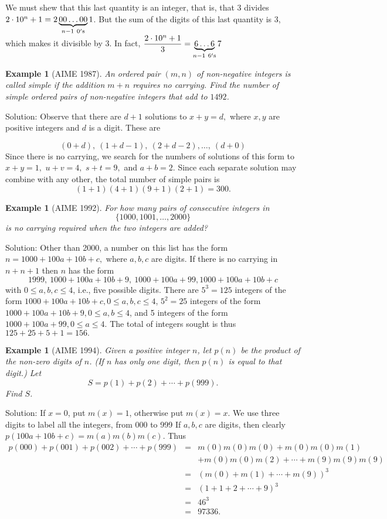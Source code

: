 \documentclass[11pt, openany]{book}
\theoremstyle{change} \theoremheaderfont{\blue\sffamily\bfseries}
\newtheorem{exa}[thm]{Example}
\theoremstyle{nonumberplain} \theoremheaderfont{\sffamily\bfseries}
\newcommand{\dis}{\displaystyle}
\newcommand{\í}{\'{\i}}
\begin{document}
We must shew that this last quantity is an integer, that is, that
3 divides $2\cdot 10^n + 1 = 2\underbrace{00\ldots 00}_{n - 1 \
0{\rm 's}}1$. But the sum of the digits of this last quantity is
3, which makes it divisible by 3. In fact, $\dis{\frac{2\cdot 10^n
+ 1}{3} = \underbrace{6\ldots 6}_{n - 1 \ 6{\rm 's}}7}$
\begin{exa}[AIME 1987] An ordered pair $(m, n)$ of non-negative integers is
called {\em simple} if the addition $m + n$ requires no carrying.
Find the number of simple ordered pairs of non-negative integers
that add to $1492$.
\end{exa}
Solution: Observe that there are $d + 1$ solutions to $x + y = d,$
where $x, y$ are positive integers and $d$ is a digit. These are

$$(0 + d), \ (1 + d - 1), \ (2 + d - 2), \ldots , \ (d + 0) $$
Since there is no carrying, we search for the numbers of solutions
of this form to $x + y = 1,$ $u + v = 4,$ $s + t = 9,$ and $a + b
= 2$. Since each separate solution may combine with any other, the
total number of simple pairs is
$$(1 + 1)(4 + 1)(9 + 1)(2 + 1) = 300.$$
\begin{exa}[AIME 1992] For how many pairs of consecutive integers in
$$\{1000, 1001, \ldots , 2000\}$$is no carrying required when the two integers are added?
\end{exa}
Solution: Other than 2000, a number on this list has the form $n =
1000 + 100a + 10b + c,$ where $a, b, c$ are digits. If there is no
carrying in $n + n + 1$ then $n$ has the form
$$1999, \ 1000 + 100a + 10b + 9, \ 1000 + 100a + 99, 1000 + 100a + 10b + c$$with
$0 \leq a, b, c \leq 4$, i.e., five possible digits. There are
$5^3 = 125$ integers of the form $1000 + 100a + 10b + c, 0 \leq a,
b, c \leq 4$, $5^2 = 25$ integers of the form  $1000 + 100a + 10b
+ 9, 0 \leq a, b \leq 4$, and 5 integers of the form $1000 + 100a
+ 99, 0 \leq a \leq 4$. The total of integers sought is thus $125
+ 25 + 5 + 1 = 156.$

\begin{exa}[AIME 1994] Given a positive integer $n$, let $p(n)$ be
the product of the non-zero digits of $n$. (If $n$ has only one
digit, then $p(n)$ is equal to that digit.) Let
$$ S = p(1) + p(2) + \cdots + p(999).$$ Find $S$. \end{exa}
Solution:  If $x = 0$, put $m(x) = 1$, otherwise put $m(x) = x.$
We use three digits to label all the integers, from 000 to 999 If
$a, b, c$ are digits, then clearly $p(100a + 10b + c) =
m(a)m(b)m(c).$ Thus
$$
\begin{array}{lll}
p(000) +  p(001) + p(002) + \cdots + p(999)
& = & m(0)m(0)m(0) + m(0)m(0)m(1)\\
&& + m(0)m(0)m(2) + \cdots + m(9)m(9)m(9) \\
 & = & (m(0) + m(1) + \cdots + m(9))^3 \\
& = & (1 + 1 + 2 + \cdots + 9)^3 \\
& = & 46^3 \\
& = & 97336.  \\
\end{array}
$$
\end{document}
